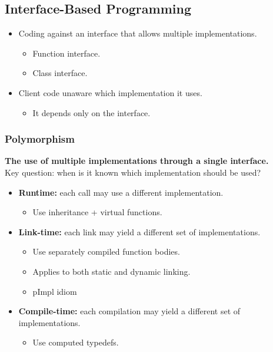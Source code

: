 \subsection{Interface-Based Programming}

\begin{itemize}
  \item Coding against an interface that allows multiple implementations.
  \begin{itemize}
    \item Function interface.
    \item Class interface.
  \end{itemize}
  \item Client code unaware which implementation it uses.
  \begin{itemize}
    \item It depends only on the interface.
  \end{itemize}
\end{itemize}

\subsubsection{Polymorphism}
\textbf{The use of multiple implementations through a single interface.}\\
Key question: when is it known which implementation should be used?
\begin{itemize}
  \item \textbf{Runtime:} each call may use a different implementation.
  \begin{itemize}
    \item Use inheritance + virtual functions.
  \end{itemize}
  \item \textbf{Link-time:} each link may yield a different set of implementations.
  \begin{itemize}
    \item Use separately compiled function bodies.
    \item Applies to both static and dynamic linking.
    \item pImpl idiom
  \end{itemize}
  \item \textbf{Compile-time:} each compilation may yield a different set of implementations.
  \begin{itemize}
    \item Use computed typedefs.
  \end{itemize}
\end{itemize}

